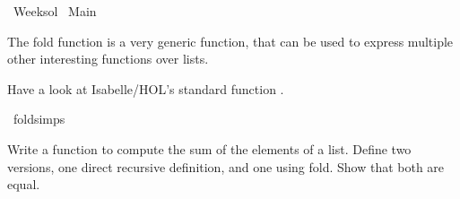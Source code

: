%
\begin{isabellebody}%
%
%
\isadelimtheory
\isanewline
%
\endisadelimtheory
%
\isatagtheory
{}\isamarkupfalse%
\ Week{\isacharunderscore}{\kern0pt}{}{\isacharunderscore}{\kern0pt}sol\isanewline
{}\ Main\isanewline
{}%
\endisatagtheory
{\isafoldtheory}%
%
\isadelimtheory
%
\endisadelimtheory
%
\begin{isamarkuptext}%
\vspace{15ex}%
\end{isamarkuptext}\isamarkuptrue%
%
\begin{isamarkuptext}%
  The fold function is a very generic function, that can be used to express 
  multiple other interesting functions over lists.%
\end{isamarkuptext}\isamarkuptrue%
%
\begin{isamarkuptext}%
Have a look at Isabelle/HOL's standard function .%
\end{isamarkuptext}\isamarkuptrue%
\isamarkupfalse%
\ fold{\isachardot}{\kern0pt}simps%
\begin{isamarkuptext}%
Write a function to compute the sum of the elements of a list. 
  Define two versions, one direct recursive definition, and one using fold.
  Show that both are equal.


\end{isamarkuptext}
\end{isabellebody}
